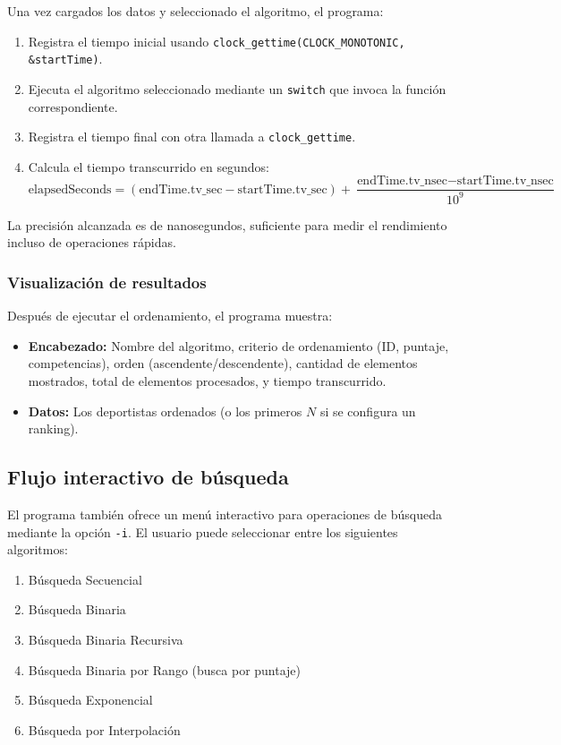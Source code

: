Una vez cargados los datos y seleccionado el algoritmo, el programa:

\begin{enumerate}
    \item Registra el tiempo inicial usando \texttt{clock\_gettime(CLOCK\_MONOTONIC, \&startTime)}.
    \item Ejecuta el algoritmo seleccionado mediante un \texttt{switch} que invoca la función correspondiente.
    \item Registra el tiempo final con otra llamada a \texttt{clock\_gettime}.
    \item Calcula el tiempo transcurrido en segundos:
    \[
    \text{elapsedSeconds} = (\text{endTime.tv\_sec} - \text{startTime.tv\_sec}) + \frac{\text{endTime.tv\_nsec} - \text{startTime.tv\_nsec}}{10^9}
    \]
\end{enumerate}

La precisión alcanzada es de nanosegundos, suficiente para medir el rendimiento incluso de operaciones rápidas.

\subsubsection{Visualización de resultados}

Después de ejecutar el ordenamiento, el programa muestra:

\begin{itemize}
    \item \textbf{Encabezado:} Nombre del algoritmo, criterio de ordenamiento (ID, puntaje, competencias), orden (ascendente/descendente), cantidad de elementos mostrados, total de elementos procesados, y tiempo transcurrido.
    \item \textbf{Datos:} Los deportistas ordenados (o los primeros \(N\) si se configura un ranking).
\end{itemize}


\subsection{Flujo interactivo de búsqueda}

El programa también ofrece un menú interactivo para operaciones de búsqueda mediante la opción \texttt{-i}. El usuario puede seleccionar entre los siguientes algoritmos:

\begin{enumerate}
    \item Búsqueda Secuencial
    \item Búsqueda Binaria
    \item Búsqueda Binaria Recursiva
    \item Búsqueda Binaria por Rango (busca por puntaje)
    \item Búsqueda Exponencial
    \item Búsqueda por Interpolación
\end{enumerate}

